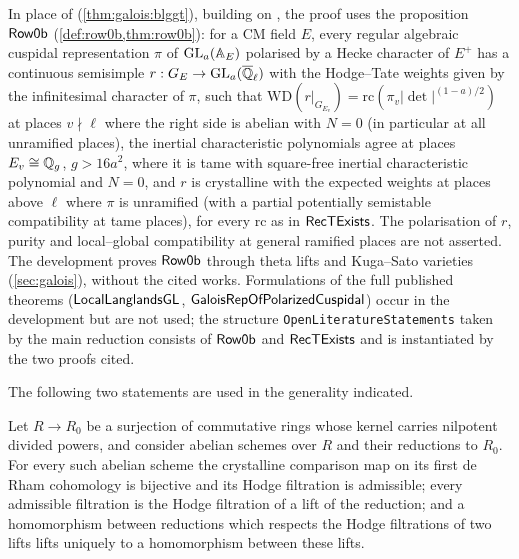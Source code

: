   In place of \cite[Thm.~2.1.1]{BarnetLambEtAl2014}
(\cref{thm:galois:blggt}), building on
\cite{HarrisTaylor2001,Shin2011,ChenevierHarris2013,Caraiani2012,Caraiani2014}, the proof uses the
proposition $\mathsf{Row0b}$ (\cref{def:row0b,thm:row0b}): for a CM field $E$, every regular algebraic
cuspidal representation $\pi$ of $\operatorname{GL}_a(\mathbb{A}_E)$ polarised by a Hecke character of $E^+$ has a
continuous semisimple $r:G_E\to\operatorname{GL}_a(\overline{\mathbb{Q}}_\ell)$ with the Hodge--Tate weights given by the infinitesimal
character of $\pi$, such that $\mathrm{WD}(r|_{G_{E_v}})=\mathrm{rc}(\pi_v|\det|^{(1-a)/2})$ at places
$v\nmid\ell$ where the right side is abelian with $N=0$ (in particular at all unramified places),
the inertial characteristic polynomials agree at places $E_v\cong\mathbb{Q}_g$, $g>16a^2$, where it is tame
with square-free inertial characteristic polynomial and $N=0$, and $r$ is crystalline with the
expected weights at places above $\ell$ where $\pi$ is unramified (with a partial potentially
semistable compatibility at tame places), for every $\mathrm{rc}$ as in $\mathsf{RecTExists}$.  The
polarisation of $r$, purity and local--global compatibility at general ramified places are not
asserted.  The development proves $\mathsf{Row0b}$ through theta lifts and Kuga--Sato varieties
(\cref{sec:galois}), without the cited works.
Formulations of the full published theorems ($\mathsf{LocalLanglandsGL}$,
$\mathsf{GaloisRepOfPolarizedCuspidal}$) occur in the development but are not used; the structure
\texttt{OpenLiteratureStatements} taken by the main reduction consists of $\mathsf{Row0b}$ and
$\mathsf{RecTExists}$ and is instantiated by the two proofs cited.

  The following two statements are used in
the generality indicated.

\begin{theorem}\Fmark\label{thm:literature:gm}
Let $R\to R_0$ be a surjection of commutative rings whose kernel carries nilpotent divided powers,
and consider abelian schemes over $R$ and their reductions to $R_0$.  For every such abelian scheme
the crystalline comparison map on its first de Rham cohomology is bijective and its Hodge filtration
is admissible; every admissible filtration is the Hodge filtration of a lift of the reduction; and a
homomorphism between reductions which respects the Hodge filtrations of two lifts lifts uniquely to a
homomorphism between these lifts.
\end{theorem}

